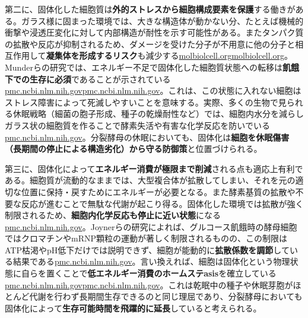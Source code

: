 第二に、固体化した細胞質は\textbf{外的ストレスから細胞構成要素を保護}する働きがある。ガラス様に固まった環境では、大きな構造体が動かない分、たとえば機械的衝撃や浸透圧変化に対して内部構造が耐性を示す可能性がある。またタンパク質の拡散や反応が抑制されるため、ダメージを受けた分子が不用意に他の分子と相互作用して\textbf{凝集体を形成するリスク}も減少する\href{https://www.molbiolcell.org/doi/10.1091/mbc.E20-02-0125\#:~:text=induces\%20a\%20massive\%20reorganization\%20of,a\%20\%E2\%80\%9Csolidification\%E2\%80\%9D\%20of\%20the\%20cytoplasm}{molbiolcell.org}\href{https://www.molbiolcell.org/doi/10.1091/mbc.E20-02-0125\#:~:text=All\%20these\%20cellular\%20rearrangements\%20result,favorable\%20environmental\%20conditions\%20are\%20restored}{molbiolcell.org}。Munderらの研究では、エネルギー不足で固体化した細胞質状態への転移は\textbf{飢餓下での生存に必須}であることが示されている\href{https://pmc.ncbi.nlm.nih.gov/articles/PMC4850707/\#:~:text=and\%20foreign\%20tracer\%20particles,fluid\%20that\%20can\%20reversibly\%20transition}{pmc.ncbi.nlm.nih.gov}\href{https://pmc.ncbi.nlm.nih.gov/articles/PMC4850707/\#:~:text=widespread\%20macromolecular\%20assembly\%20of\%20proteins,like\%20state}{pmc.ncbi.nlm.nih.gov}。これは、この状態に入れない細胞はストレス障害によって死滅しやすいことを意味する。実際、多くの生物で見られる休眠戦略（細菌の胞子形成、種子の乾燥耐性など）では、細胞内水分を減らしガラス状の細胞質を作ることで酵素失活や有害な化学反応を防いでいる\href{https://pmc.ncbi.nlm.nih.gov/articles/PMC6857596/\#:~:text=organisation,high\%20amounts\%20of\%20carbohydrates\%2C\%20possibly}{pmc.ncbi.nlm.nih.gov}。分裂酵母の休眠においても、固体化は\textbf{細胞を休眠傷害（長期間の停止による構造劣化）から守る防御策}と位置づけられる。

第三に、固体化によって\textbf{エネルギー消費が極限まで削減}される点も適応上有利である。細胞質が流動的なままでは、大型複合体が拡散してしまい、それを元の適切な位置に保持・戻すためにエネルギーが必要となる。また酵素基質の拡散や不要な反応が進むことで無駄な代謝が起こり得る。固体化した環境では拡散が強く制限されるため、\textbf{細胞内化学反応も停止に近い状態}になる\href{https://pmc.ncbi.nlm.nih.gov/articles/PMC4811765/\#:~:text=undertakes\%20a\%20startling\%20transition\%20upon,which\%20cells\%20globally\%20alter\%20their}{pmc.ncbi.nlm.nih.gov}。Joynerらの研究によれば、グルコース飢餓時の酵母細胞ではクロマチンやmRNP顆粒の運動が著しく制限されるものの、この制限はATP枯渇やpH低下だけでは説明できず、細胞が能動的に\textbf{拡散係数を調節}している結果である\href{https://pmc.ncbi.nlm.nih.gov/articles/PMC4811765/\#:~:text=undertakes\%20a\%20startling\%20transition\%20upon,which\%20cells\%20globally\%20alter\%20their}{pmc.ncbi.nlm.nih.gov}。言い換えれば、細胞は固体化という物理状態に自らを置くことで\textbf{低エネルギー消費のホームステasis}を確立している\href{https://pmc.ncbi.nlm.nih.gov/articles/PMC4811765/\#:~:text=undertakes\%20a\%20startling\%20transition\%20upon,which\%20cells\%20globally\%20alter\%20their}{pmc.ncbi.nlm.nih.gov}\href{https://pmc.ncbi.nlm.nih.gov/articles/PMC4811765/\#:~:text=mobility\%20is\%20induced\%20by\%20a,a\%20unique\%20homeostasis\%20during\%20starvation}{pmc.ncbi.nlm.nih.gov}。これは乾眠中の種子や休眠芽胞がほとんど代謝を行わず長期間生存できるのと同じ理屈であり、分裂酵母においても固体化によって\textbf{生存可能時間を飛躍的に延長}していると考えられる。

